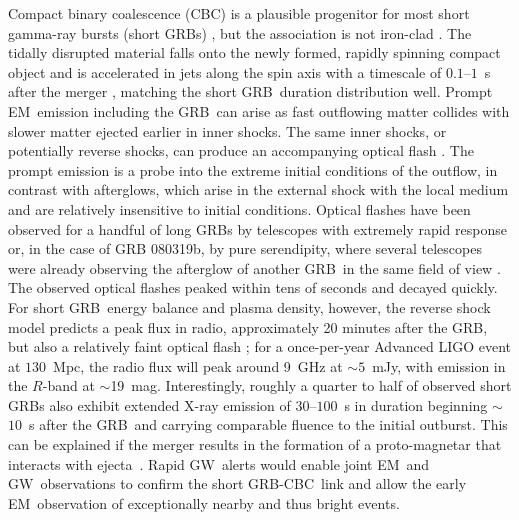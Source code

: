 \documentclass[preprint2]{aastex}
\newcommand{\GW}{GW}%
\newcommand{\EM}{EM}%
\newcommand{\GRB}{GRB}%
\newcommand{\CBC}{CBC}%
\begin{document}
Compact binary coalescence (\CBC) is a plausible progenitor for most short
gamma-ray bursts (short \GRB{}s) \citep{Lee:2005, nakar07}, but the
association is not iron-clad \citep{2011ApJ...727..109V}. The tidally
disrupted material falls onto the newly formed, rapidly spinning compact object
and is accelerated in jets along the spin axis with a timescale of $0.1$--$1$~s
after the merger \citep{Janka1999}, matching the short \GRB\ duration
distribution well. Prompt \EM\ emission including the \GRB\ can arise as fast
outflowing matter collides with slower matter ejected earlier in inner shocks.
The same inner shocks, or potentially reverse shocks, can produce an
accompanying optical flash \citep{Sari99}. The prompt emission is a probe into
the extreme initial conditions of the outflow, in contrast with afterglows,
which arise in the external shock with the local medium and are relatively
insensitive to initial conditions. Optical flashes have been observed for a
handful of long \GRB{}s \citep{2011CRPhy..12..255A} by telescopes with extremely
rapid response or, in the case of GRB 080319b, by pure serendipity, where
several telescopes were already observing the afterglow of another \GRB\ in
the same field of view \citep{2008Natur.455..183R}. The observed optical flashes
peaked within tens of seconds and decayed quickly. For short \GRB\ energy
balance and plasma density, however, the reverse shock model predicts a peak
flux in radio, approximately 20 minutes after the \GRB, but also a relatively
faint optical flash \citep{nakar07}; for a once-per-year Advanced LIGO event at
$130$~Mpc, the radio flux will peak around 9~GHz at $\sim$$5$~mJy, with emission
in the $R$-band at $\sim$19~mag. Interestingly, roughly a quarter to half of
observed short \GRB{}s also exhibit extended X-ray emission of $30$--$100$~s in
duration beginning $\sim$$10$~s after the \GRB\ and carrying comparable fluence
to the initial outburst. This can be explained if the merger results in the
formation of a proto-magnetar that interacts with
ejecta~\citep{Bucciantini2011}. Rapid \GW\ alerts would enable joint \EM\ and
\GW\ observations to confirm the short \GRB-\CBC\ link and allow the early
\EM\ observation of exceptionally nearby and thus bright events.
\end{document}
